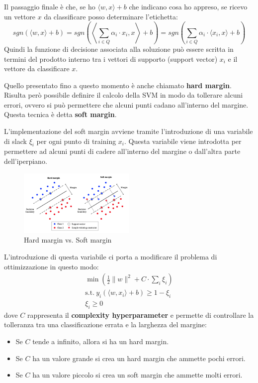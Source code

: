 Il passaggio finale è che, se ho $\langle w, x \rangle + b$ che indicano cosa ho
appreso, se ricevo un vettore $x$ da classificare posso determinare l'etichetta:
\begin{equation}
    sgn(\langle w, x \rangle + b) = sgn\left(\left\langle \sum_{i \in Q} \alpha_i
    \cdot x_i, x \right\rangle + b \right) = sgn\left(\sum_{i \in Q} \alpha_i
    \cdot \langle x_i, x\rangle + b \right)
\end{equation}
Quindi la funzione di decisione associata alla soluzione può essere scritta in
termini del prodotto interno tra i vettori di supporto (support vector) $x_i$ e
il vettore da classificare $x$.

Quello presentato fino a questo momento è anche chiamato \textbf{hard margin}.
Risulta però possibile definire il calcolo della SVM in modo da tollerare alcuni
errori, ovvero si può permettere che alcuni punti cadano all'interno del margine.
Questa tecnica è detta \textbf{soft margin}.

L'implementazione del soft margin avviene tramite l'introduzione di una variabile
di slack $\xi_i$ per ogni punto di training $x_i$. Questa variabile viene
introdotta per permettere ad alcuni punti di cadere all'interno del margine o
dall'altra parte dell'iperpiano.
\begin{figure}[!ht]
    \centering
    \includegraphics[width = 0.5\textwidth]{img/svm/margin.png}
    \caption{Hard margin vs. Soft margin}
    \label{fig:soft_margin}
\end{figure}
L'introduzione di questa variabile ci porta a modificare il problema di ottimizzazione
in questo modo:
\begin{equation}
    \begin{aligned}
        \min \left(\frac{1}{2} \| w \|^2 + C \cdot \sum_{i} \xi_i \right) \\
        \text{s.t.} \ y_i (\langle w, x_i \rangle + b) \geq 1 - \xi_i     \\
        \xi_i \geq 0
    \end{aligned}
\end{equation}
dove $C$ rappresenta il \textbf{complexity hyperparameter} e permette di
controllare la tolleranza  tra una classificazione errata e la larghezza del
margine:
\begin{itemize}
    \item Se $C$ tende a infinito, allora si ha un hard margin.
    \item Se $C$ ha un valore grande si crea un hard margin che ammette pochi
          errori.
    \item Se $C$ ha un valore piccolo si crea un soft margin che ammette molti
          errori.
\end{itemize}
